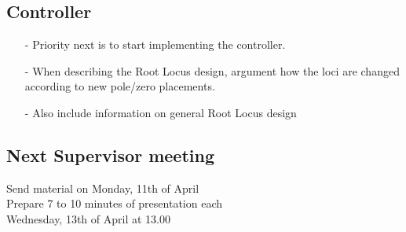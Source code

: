 \subsection{Controller}
\begin{itemize}
  \item[-] Priority next is to start implementing the controller.
  \item[-] When describing the Root Locus design, argument how the loci are changed according to new pole/zero placements.
  \item[-] Also include information on general Root Locus design 
\end{itemize}

\subsection{Next Supervisor meeting}
Send material on Monday, 11th of April\\
Prepare 7 to 10 minutes of presentation each\\
Wednesday, 13th of April at 13.00

